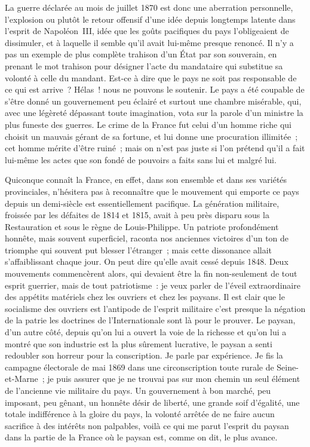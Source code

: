 \documentclass[french,twoside]{book} %
\begin{document}
La guerre déclarée au mois de juillet 1870 est donc une aberration personnelle, l’explosion ou plutôt le retour offensif d’une idée depuis longtemps latente dans l’esprit de Napoléon III, idée que les goûts pacifiques du pays l’obligeaient de dissimuler, et à laquelle il semble qu’il avait lui-même presque renoncé. Il n’y a pas un exemple de plus complète trahison d’un État par son souverain, en prenant le mot trahison pour désigner l’acte du mandataire qui substitue sa volonté à celle du mandant. Est-ce à dire que le pays ne soit pas responsable de ce qui est arrive ? Hélas ! nous ne pouvons le soutenir. Le pays a été coupable de s’être donné un gouvernement peu éclairé et surtout une chambre misérable, qui, avec une légèreté dépassant toute imagination, vota sur la parole d’un ministre la plus funeste des guerres. Le crime de la France fut celui d’un homme riche qui choisit un mauvais gérant de sa fortune, et lui donne une procuration illimitée ; cet homme mérite d’être ruiné ; mais on n’est pas juste si l’on prétend qu’il a fait lui-même les actes que son fondé de pouvoirs a faits sans lui et malgré lui.\par
Quiconque connaît la France, en effet, dans son ensemble et dans ses variétés provinciales, n’hésitera pas à reconnaître que le mouvement qui emporte ce pays depuis un demi-siècle est essentiellement pacifique. La génération militaire, froissée par les défaites de 1814 et 1815, avait à peu près disparu sous la Restauration et sous le règne de Louis-Philippe. Un patriote profondément honnête, mais souvent superficiel, raconta nos anciennes victoires d’un ton de triomphe qui souvent put blesser l’étranger ; mais cette dissonance allait s’affaiblissant chaque jour. On peut dire qu’elle avait cessé depuis 1848. Deux mouvements commencèrent alors, qui devaient être la fin non-seulement de tout esprit guerrier, mais de tout patriotisme : je veux parler de l’éveil extraordinaire des appétits matériels chez les ouvriers et chez les paysans. Il est clair que le socialisme des ouvriers est l’antipode de l’esprit militaire c’est presque la négation de la patrie les doctrines de l’Internationale sont là pour le prouver. Le paysan, d’un autre côté, depuis qu’on lui a ouvert la voie de la richesse et qu’on lui a montré que son industrie est la plus sûrement lucrative, le paysan a senti redoubler son horreur pour la conscription. Je parle par expérience. Je fis la campagne électorale de mai 1869 dans une circonscription toute rurale de Seine-et-Marne ; je puis assurer que je ne trouvai pas sur mon chemin un seul élément de l’ancienne vie militaire du pays. Un gouvernement à bon marché, peu imposant, peu gênant, un honnête désir de liberté, une grande soif d’égalité, une totale indifférence à la gloire du pays, la volonté arrêtée de ne faire aucun sacrifice à des intérêts non palpables, voilà ce qui me parut l’esprit du paysan dans la partie de la France où le paysan est, comme on dit, le plus avance.\par
\end{document}
